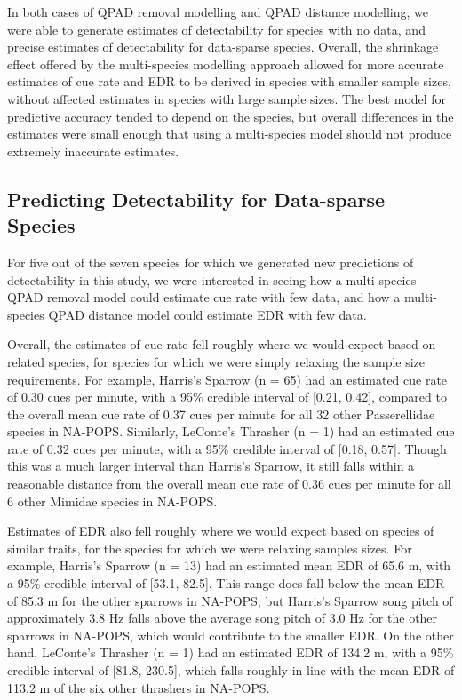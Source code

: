 \documentclass[12pt]{article}
\begin{document}
\par In both cases of QPAD removal modelling and QPAD distance modelling, we were able to generate estimates of detectability for species with no data, and precise estimates of detectability for data-sparse species.
Overall, the shrinkage effect offered by the multi-species modelling approach allowed for more accurate estimates of cue rate and EDR to be derived in species with smaller sample sizes, without affected estimates in species with large sample sizes.
The best model for predictive accuracy tended to depend on the species, but overall differences in the estimates were small enough that using a multi-species model should not produce extremely inaccurate estimates.

\subsection{Predicting Detectability for Data-sparse Species}

\par For five out of the seven species for which we generated new predictions of detectability in this study, we were interested in seeing how a multi-species QPAD removal model could estimate cue rate with few data, and how a multi-species QPAD distance model could estimate EDR with few data.

\par Overall, the estimates of cue rate fell roughly where we would expect based on related species, for species for which we were simply relaxing the sample size requirements.
For example, Harris's Sparrow (n = 65) had an estimated cue rate of 0.30 cues per minute, with a 95\% credible interval of [0.21, 0.42], compared to the overall mean cue rate of 0.37 cues per minute for all 32 other Passerellidae species in NA-POPS.
Similarly, LeConte's Thrasher (n = 1) had an estimated cue rate of 0.32 cues per minute, with a 95\% credible interval of [0.18, 0.57].
Though this was a much larger interval than Harris's Sparrow, it still falls within a reasonable distance from the overall mean cue rate of 0.36 cues per minute for all 6 other Mimidae species in NA-POPS.

\par Estimates of EDR also fell roughly where we would expect based on species of similar traits, for the species for which we were relaxing samples sizes.
For example, Harris's Sparrow (n = 13) had an estimated mean EDR of 65.6 m, with a 95\% credible interval of [53.1, 82.5].
This range does fall below the mean EDR of 85.3 m for the other sparrows in NA-POPS, but Harris's Sparrow song pitch of approximately 3.8 Hz falls above the average song pitch of 3.0 Hz for the other sparrows in NA-POPS, which would contribute to the smaller EDR.
On the other hand, LeConte's Thrasher (n = 1) had an estimated EDR of 134.2 m, with a 95\% credible interval of [81.8, 230.5], which falls roughly in line with the mean EDR of 113.2 m of the six other thrashers in NA-POPS.
\end{document}
